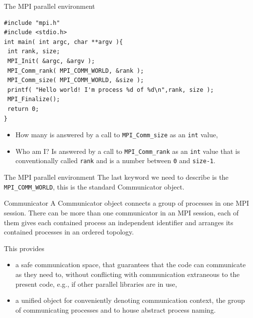 \documentclass{beamer}
\begin{document}
\begin{frame}[fragile]{The MPI parallel environment}
\begin{verbatim}
#include "mpi.h"
#include <stdio.h>
int main( int argc, char **argv ){
 int rank, size;
 MPI_Init( &argc, &argv );
 MPI_Comm_rank( MPI_COMM_WORLD, &rank );
 MPI_Comm_size( MPI_COMM_WORLD, &size );
 printf( "Hello world! I'm process %d of %d\n",rank, size );
 MPI_Finalize();
 return 0;
}
\end{verbatim}
\begin{itemize}
	\item How many is answered by a call to \texttt{MPI_Comm_size} as an \texttt{int} value,
	\item Who am I? Is answered by a call to \texttt{MPI_Comm_rank} as an \texttt{int} value that is conventionally called \texttt{rank} and is a number between \texttt{0} and \texttt{size-1}.
\end{itemize}
\end{frame}


\begin{frame}{The MPI parallel environment}
	The last keyword we need to describe is the \texttt{MPI_COMM_WORLD}, this is the standard Communicator object.

	\begin{block}{Communicator}
	A Communicator object connects a group of processes in one MPI session. There can be more than one communicator in an MPI session, each of them gives each contained process an independent identifier and arranges its contained processes in an ordered topology.
	\end{block}

	This provides
	\begin{itemize}
	\item a safe communication space, that guarantees that the code can communicate as they
	need to, without conflicting with communication extraneous to the present code, e.g., if other parallel libraries are in use,
	\item a unified object for conveniently denoting communication context, the group of communicating processes and to house abstract process naming.
	\end{itemize}
\end{frame}
\end{document}
